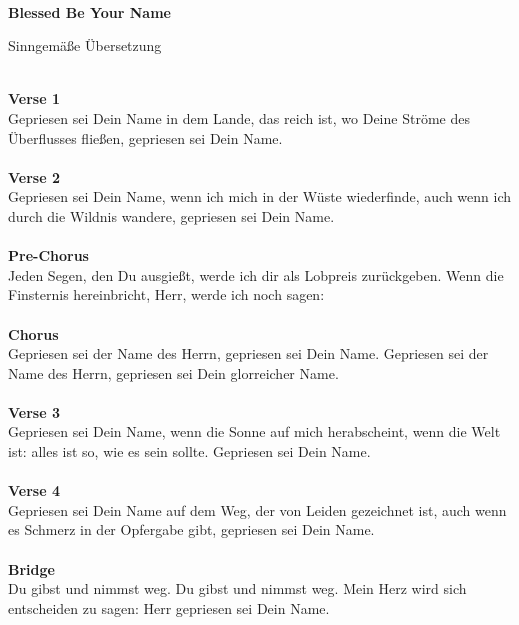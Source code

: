 \mbox{}\\
\huge\centerline{\textbf{Blessed Be Your Name}}
\normalsize \centerline{Sinngemäße Übersetzung}
\mbox{}\\
\textbf{Verse 1}\\
Gepriesen sei Dein Name in dem Lande, das reich ist, wo Deine Ströme des Überflusses fließen, gepriesen sei Dein Name.\\
\\
\textbf{Verse 2}\\
Gepriesen sei Dein Name, wenn ich mich in der Wüste wiederfinde, auch wenn ich durch die Wildnis wandere, gepriesen sei Dein Name.\\
\\
\textbf{Pre-Chorus}\\
Jeden Segen, den Du ausgießt, werde ich dir als Lobpreis zurückgeben.
Wenn die Finsternis hereinbricht, Herr, werde ich noch sagen:\\
\\
\textbf{Chorus}\\
Gepriesen sei der Name des Herrn, gepriesen sei Dein Name.
Gepriesen sei der Name des Herrn, gepriesen sei Dein glorreicher Name.\\
\\
\textbf{Verse 3}\\
Gepriesen sei Dein Name, wenn die Sonne auf mich herabscheint, wenn die Welt ist: \grqq alles ist so, wie es sein sollte\grqq. Gepriesen sei Dein Name.\\
\\
\textbf{Verse 4}\\
Gepriesen sei Dein Name auf dem Weg, der von Leiden gezeichnet ist, auch wenn es Schmerz in der Opfergabe gibt, gepriesen sei Dein Name.\\
\\
\textbf{Bridge}\\
Du gibst und nimmst weg. Du gibst und nimmst weg.
Mein Herz wird sich entscheiden zu sagen: Herr gepriesen sei Dein Name.

